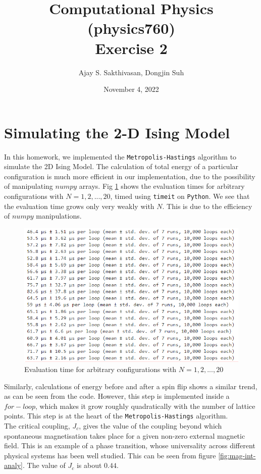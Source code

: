 \documentclass{article}
\title{Computational Physics (physics760)\\Exercise 2}
\author{Ajay S. Sakthivasan, Dongjin Suh}
\date{November 4, 2022}
\begin{document}
\maketitle

\section{Simulating the 2-D Ising Model}
In this homework, we implemented the \verb|Metropolis-Hastings| algorithm to simulate the 2D Ising Model. The calculation of total energy of a particular configuration is much more efficient in our implementation, due to the possibility of manipulating $numpy$ arrays. Fig \ref{fig:energy-calc} shows the evaluation times for arbitrary configurations with $N = 1, 2, ..., 20$, timed using \verb|timeit| on \verb|Python|. We see that the evaluation time grows only very weakly with $N$. This is due to the efficiency of $numpy$ manipulations.\\
\begin{figure}[h!]
    \centering
    \includegraphics[width=.9\textwidth]{energy-calc.png}
    \caption{Evaluation time for arbitrary configurations with $N = 1, 2, ..., 20$}
    \label{fig:energy-calc}
\end{figure}
Similarly, calculations of energy before and after a spin flip shows a similar trend, as can be seen from the code. However, this step is implemented inside a $for-loop$, which makes it grow roughly quadratically with the number of lattice points. This step is at the heart of the \verb|Metropolis-Hastings| algorithm.\\
The critical coupling, $J_c$, gives the value of the coupling beyond which spontaneous magnetisation takes place for a given non-zero external magnetic field. This is an example of a phase transition, whose universality across different physical systems has been well studied. This can be seen from figure \ref{fig:mag-int-analy}. The value of $J_c$ is about $0.44$.\\
\end{document}
